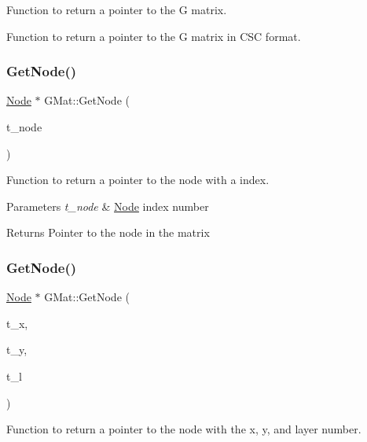 Function to return a pointer to the G matrix. 

Function to return a pointer to the G matrix in C\+SC format. \mbox{\label{classGMat_a48cc4288be2ae357591bab12339e0114}} 
\subsubsection{\texorpdfstring{Get\+Node()}{GetNode()}\hspace{0.1cm}{\footnotesize\ttfamily [1/2]}}
{\footnotesize\ttfamily \hyperlink{classNode}{Node} $\ast$ G\+Mat\+::\+Get\+Node (\begin{DoxyParamCaption}\item[{\hyperlink{node_8h_a5b622fe4354316a2f349615d150ae998}{Node\+Idx}}]{t\+\_\+node }\end{DoxyParamCaption})}



Function to return a pointer to the node with a index. 


\begin{DoxyParams}{Parameters}
{\em t\+\_\+node} & \hyperlink{classNode}{Node} index number \\
\hline
\end{DoxyParams}
\begin{DoxyReturn}{Returns}
Pointer to the node in the matrix 
\end{DoxyReturn}
\mbox{\label{classGMat_a54844be32da6280169a0f8ee08283d5a}} 
\subsubsection{\texorpdfstring{Get\+Node()}{GetNode()}\hspace{0.1cm}{\footnotesize\ttfamily [2/2]}}
{\footnotesize\ttfamily \hyperlink{classNode}{Node} $\ast$ G\+Mat\+::\+Get\+Node (\begin{DoxyParamCaption}\item[{int}]{t\+\_\+x,  }\item[{int}]{t\+\_\+y,  }\item[{int}]{t\+\_\+l }\end{DoxyParamCaption})}



Function to return a pointer to the node with the x, y, and layer number. 

